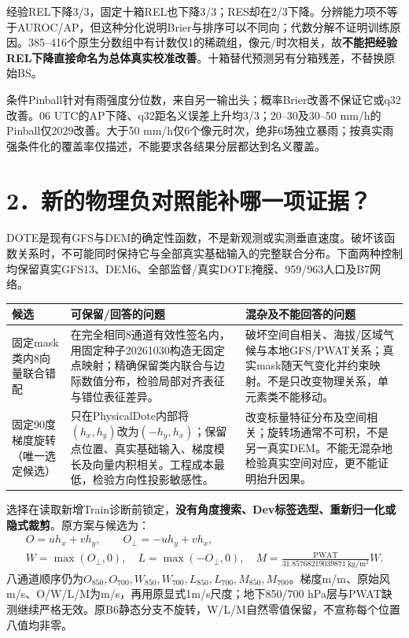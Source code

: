 \documentclass[UTF8,a4paper,10pt,fontset=none]{ctexart}
\begin{document}
经验REL下降3/3，固定十箱REL也下降3/3；RES却在2/3下降。分辨能力项不等于AUROC/AP，但这种分化说明Brier与排序可以不同向；代数分解不证明训练原因。385--416个原生分数组中有计数仅1的稀疏组，像元/时次相关，故\textbf{不能把经验REL下降直接命名为总体真实校准改善}。十箱替代预测另有分箱残差，不替换原始BS。

条件Pinball针对有雨强度分位数，来自另一输出头；概率Brier改善不保证它或q32改善。06 UTC的AP下降、q32距名义误差上升均3/3；20--30及30--50 mm/h的Pinball仅2029改善。大于50 mm/h仅6个像元时次，绝非6场独立暴雨；按真实雨强条件化的覆盖率仅描述，不能要求各结果分层都达到名义覆盖。
\newpage

\section*{2．新的物理负对照能补哪一项证据？}
DOTE是现有GFS与DEM的确定性函数，不是新观测或实测垂直速度。破坏该函数关系时，不可能同时保持它与全部真实基础输入的完整联合分布。下面两种控制均保留真实GFS13、DEM6、全部监督/真实DOTE掩膜、959/963人口及B7网络。

\begin{tabularx}{\linewidth}{@{}p{29mm}XX@{}}
\toprule
候选 & 可保留/回答的问题 & 混杂及不能回答的问题\\
\midrule
固定mask类内8向量联合错配 &
在完全相同8通道有效性签名内，用固定种子20261030构造无固定点映射；精确保留类内联合与边际数值分布，检验局部对齐表征与错位表征差异。 &
破坏空间自相关、海拔/区域气候与本地GFS/PWAT关系；真实mask随天气变化并约束映射。不是只改变物理关系，单元素类不能移动。\\
\addlinespace
固定90度梯度旋转（唯一选定候选） &
只在PhysicalDote内部将$(h_x,h_y)$改为$(-h_y,h_x)$；保留点位置、真实基础输入、梯度模长及向量内积相关。工程成本最低，检验方向性投影敏感性。 &
改变标量特征分布及空间相关；旋转场通常不可积，不是另一真实DEM。不能无混杂地检验真实空间对应，更不能证明抬升因果。\\
\bottomrule
\end{tabularx}

选择在读取新增Train诊断前锁定，\textbf{没有角度搜索、Dev标签选型、重新归一化或隐式裁剪}。原方案与候选为：
\begin{gather*}
 O=u h_x+v h_y,\qquad O_\perp=-u h_y+v h_x,\\
 W=\max(O_\perp,0),\quad L=\max(-O_\perp,0),\quad
 M=\frac{\mathrm{PWAT}}{31.85768219039871\ \mathrm{kg/m^2}}W.
\end{gather*}
八通道顺序仍为$O_{850},O_{700},W_{850},W_{700},L_{850},L_{700},M_{850},M_{700}$。梯度m/m、原始风m/s、O/W/L/M为m/s，再用原显式1m/s尺度；地下850/700 hPa层与PWAT缺测继续严格无效。原B6静态分支不旋转，W/L/M自然零值保留，不宣称每个位置八值均非零。
\end{document}
